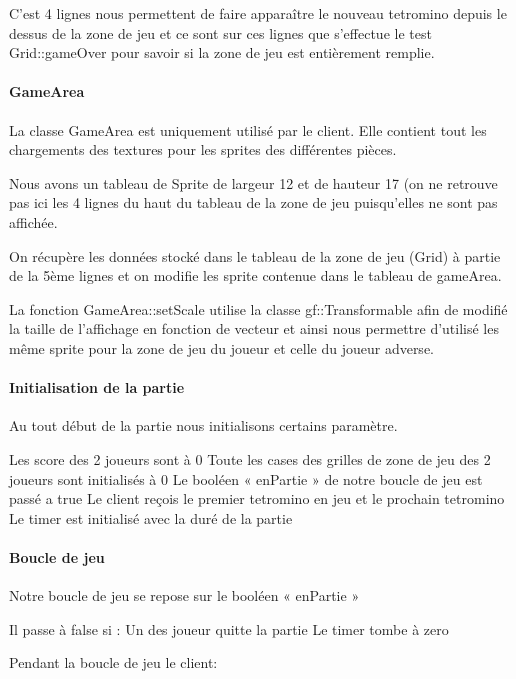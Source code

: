 \documentclass[a4paper, 12pt]{article}
\begin{document}
			C’est 4 lignes nous permettent de faire apparaître le nouveau tetromino depuis le dessus de la zone de jeu et ce sont sur ces lignes que s’effectue le test Grid::gameOver pour savoir si la zone de jeu est entièrement remplie.


			\paragraph{GameArea}

			La classe GameArea est uniquement utilisé par le client. Elle contient tout les chargements des textures pour les sprites des différentes pièces.

			Nous avons un tableau de Sprite de largeur 12 et de hauteur 17 (on ne retrouve pas ici les 4 lignes du haut du tableau de la zone de jeu puisqu’elles ne sont pas affichée.

			On récupère les données stocké dans le tableau de la zone de jeu (Grid) à partie de la 5ème lignes et on modifie les sprite contenue dans le tableau de gameArea.

			La fonction GameArea::setScale utilise la classe gf::Transformable afin de modifié la taille de l’affichage en fonction de vecteur et ainsi nous permettre d’utilisé les même sprite pour la zone de jeu du joueur et celle du joueur adverse.

			\paragraph{Initialisation de la partie}

				Au tout début de la partie nous initialisons certains paramètre.

				Les score des 2 joueurs sont à 0
				Toute les cases des grilles de zone de jeu des 2 joueurs sont initialisés à 0
				Le booléen « enPartie » de notre boucle de jeu est passé a true
				Le client reçois le premier tetromino en jeu et le prochain tetromino
				Le timer est initialisé avec la duré de la partie


			\paragraph{Boucle de jeu}

Notre boucle de jeu se repose sur le booléen « enPartie »

Il passe à false si : 
    Un des joueur quitte la partie
    Le timer tombe à zero

Pendant la boucle de jeu le client:
\end{document}
